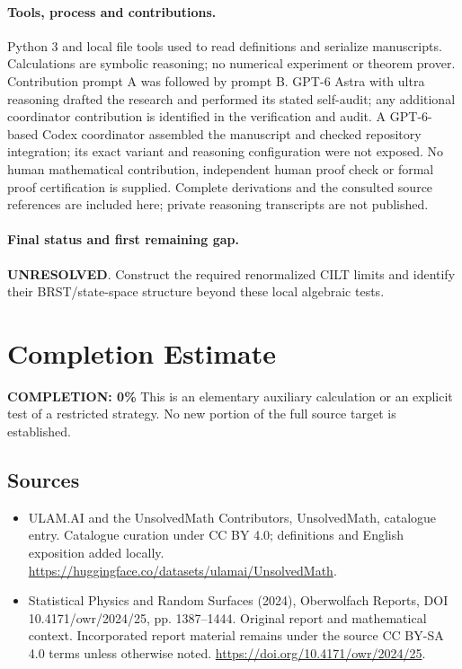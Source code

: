 \documentclass[11pt]{article}
\begin{document}
\paragraph{Tools, process and contributions.}
Python 3 and local file tools used to read definitions and serialize manuscripts. Calculations are symbolic reasoning; no numerical experiment or theorem prover. Contribution prompt A was followed by prompt B. GPT-6 Astra with ultra reasoning drafted the research and performed its stated self-audit; any additional coordinator contribution is identified in the verification and audit. A GPT-6-based Codex coordinator assembled the manuscript and checked repository integration; its exact variant and reasoning configuration were not exposed. No human mathematical contribution, independent human proof check or formal proof certification is supplied. Complete derivations and the consulted source references are included here; private reasoning transcripts are not published.

\paragraph{Final status and first remaining gap.}
\textbf{UNRESOLVED}. Construct the required renormalized CILT limits and identify their BRST/state-space structure beyond these local algebraic tests.

\section{Completion Estimate}
\noindent\textbf{COMPLETION: 0\%}
This is an elementary auxiliary calculation or an explicit test of a restricted strategy. No new portion of the full source target is established.

\subsection{Sources}
\begin{itemize}
\item[\hypertarget{source:statement:1}{S1}] ULAM.AI and the UnsolvedMath Contributors, UnsolvedMath, catalogue entry. Catalogue curation under CC BY 4.0; definitions and English exposition added locally.
\url{https://huggingface.co/datasets/ulamai/UnsolvedMath}.
\item[\hypertarget{source:statement:2}{S2}] Statistical Physics and Random Surfaces (2024), Oberwolfach Reports, DOI 10.4171/owr/2024/25, pp. 1387--1444. Original report and mathematical context. Incorporated report material remains under the source CC BY-SA 4.0 terms unless otherwise noted.
\url{https://doi.org/10.4171/owr/2024/25}.
\end{itemize}
\label{end:statement}
\end{document}
